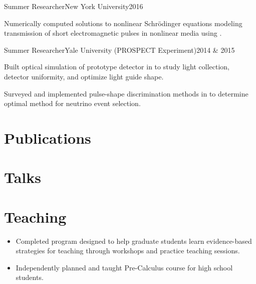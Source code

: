 \documentclass{cultvoucher}
\begin{document}
\begin{entry}{Summer Researcher}{New York University}{2016}
	\item Numerically computed solutions to nonlinear Schr\"{o}dinger equations modeling transmission of short electromagnetic pulses in nonlinear media using .
\end{entry}

\begin{entry}{Summer Researcher}{Yale University (\textsc{PROSPECT} Experiment)}{2014 \& 2015}
	\item Built optical simulation of prototype detector in  to study light collection, detector uniformity, and optimize light guide shape.
	\item Surveyed and implemented pulse-shape discrimination methods in  to determine optimal method for neutrino event selection.
\end{entry}

\section{Publications} %

\section{Talks}

\section{Teaching}

\begin{itemize}
	\item Completed program designed to help graduate students learn evidence-based strategies for teaching through workshops and practice teaching sessions.
\end{itemize}

\begin{itemize}
	\item Independently planned and taught Pre-Calculus course for high school students.
\end{itemize}
\end{document}

